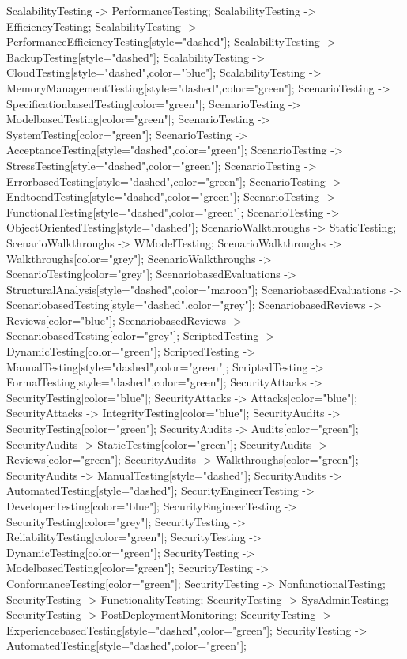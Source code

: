 \documentclass{article}
\begin{document}
{ScalabilityTesting -> PerformanceTesting;
ScalabilityTesting -> EfficiencyTesting;
ScalabilityTesting -> PerformanceEfficiencyTesting[style="dashed"];
ScalabilityTesting -> BackupTesting[style="dashed"];
ScalabilityTesting -> CloudTesting[style="dashed",color="blue"];
ScalabilityTesting -> MemoryManagementTesting[style="dashed",color="green"];
ScenarioTesting -> SpecificationbasedTesting[color="green"];
ScenarioTesting -> ModelbasedTesting[color="green"];
ScenarioTesting -> SystemTesting[color="green"];
ScenarioTesting -> AcceptanceTesting[style="dashed",color="green"];
ScenarioTesting -> StressTesting[style="dashed",color="green"];
ScenarioTesting -> ErrorbasedTesting[style="dashed",color="green"];
ScenarioTesting -> EndtoendTesting[style="dashed",color="green"];
ScenarioTesting -> FunctionalTesting[style="dashed",color="green"];
ScenarioTesting -> ObjectOrientedTesting[style="dashed"];
ScenarioWalkthroughs -> StaticTesting;
ScenarioWalkthroughs -> WModelTesting;
ScenarioWalkthroughs -> Walkthroughs[color="grey"];
ScenarioWalkthroughs -> ScenarioTesting[color="grey"];
ScenariobasedEvaluations -> StructuralAnalysis[style="dashed",color="maroon"];
ScenariobasedEvaluations -> ScenariobasedTesting[style="dashed",color="grey"];
ScenariobasedReviews -> Reviews[color="blue"];
ScenariobasedReviews -> ScenariobasedTesting[color="grey"];
ScriptedTesting -> DynamicTesting[color="green"];
ScriptedTesting -> ManualTesting[style="dashed",color="green"];
ScriptedTesting -> FormalTesting[style="dashed",color="green"];
SecurityAttacks -> SecurityTesting[color="blue"];
SecurityAttacks -> Attacks[color="blue"];
SecurityAttacks -> IntegrityTesting[color="blue"];
SecurityAudits -> SecurityTesting[color="green"];
SecurityAudits -> Audits[color="green"];
SecurityAudits -> StaticTesting[color="green"];
SecurityAudits -> Reviews[color="green"];
SecurityAudits -> Walkthroughs[color="green"];
SecurityAudits -> ManualTesting[style="dashed"];
SecurityAudits -> AutomatedTesting[style="dashed"];
SecurityEngineerTesting -> DeveloperTesting[color="blue"];
SecurityEngineerTesting -> SecurityTesting[color="grey"];
SecurityTesting -> ReliabilityTesting[color="green"];
SecurityTesting -> DynamicTesting[color="green"];
SecurityTesting -> ModelbasedTesting[color="green"];
SecurityTesting -> ConformanceTesting[color="green"];
SecurityTesting -> NonfunctionalTesting;
SecurityTesting -> FunctionalityTesting;
SecurityTesting -> SysAdminTesting;
SecurityTesting -> PostDeploymentMonitoring;
SecurityTesting -> ExperiencebasedTesting[style="dashed",color="green"];
SecurityTesting -> AutomatedTesting[style="dashed",color="green"];
}
\end{document}
